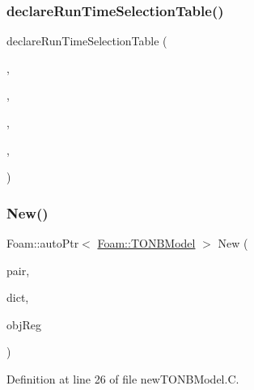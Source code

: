 \mbox{\label{classFoam_1_1TONBModel_a8e50c35d0a37a79d3c2a0cda5fa5a1ff}} 
\subsubsection{\texorpdfstring{declare\+Run\+Time\+Selection\+Table()}{declareRunTimeSelectionTable()}}
{\footnotesize\ttfamily declare\+Run\+Time\+Selection\+Table (\begin{DoxyParamCaption}\item[{auto\+Ptr}]{,  }\item[{\hyperlink{classFoam_1_1TONBModel}{T\+O\+N\+B\+Model}}]{,  }\item[{T\+O\+N\+B\+Models}]{,  }\item[{(const \hyperlink{classFoam_1_1FSPair}{F\+S\+Pair} \&pair, const dictionary \&dict, const object\+Registry \&obj\+Reg)}]{,  }\item[{(pair, dict, obj\+Reg)}]{ }\end{DoxyParamCaption})}

\mbox{\label{classFoam_1_1TONBModel_adb431ddf087e79fec7a2b09c0c469715}} 
\subsubsection{\texorpdfstring{New()}{New()}}
{\footnotesize\ttfamily Foam\+::auto\+Ptr$<$ \hyperlink{classFoam_1_1TONBModel}{Foam\+::\+T\+O\+N\+B\+Model} $>$ New (\begin{DoxyParamCaption}\item[{const \hyperlink{classFoam_1_1FSPair}{F\+S\+Pair} \&}]{pair,  }\item[{const dictionary \&}]{dict,  }\item[{const object\+Registry \&}]{obj\+Reg }\end{DoxyParamCaption})\hspace{0.3cm}{\ttfamily [static]}}



Definition at line 26 of file new\+T\+O\+N\+B\+Model.\+C.



